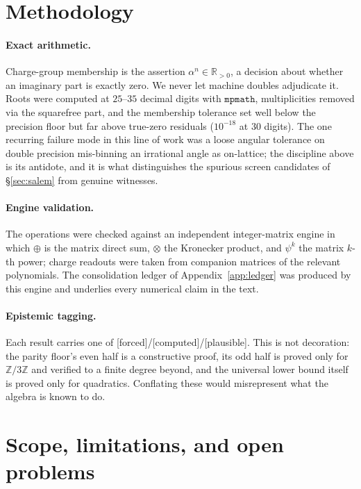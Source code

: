 \documentclass[11pt]{article}
\theoremstyle{definition}
\theoremstyle{remark}
\newcommand{\Z}{\mathbb{Z}}
\newcommand{\R}{\mathbb{R}}
\newcommand{\Adams}[1]{\psi^{#1}}
\newcommand{\dsum}{\oplus}
\newcommand{\tens}{\otimes}
\newcommand{\Zmod}[1]{\Z/#1\Z}
\newcommand{\status}[1]{{\small\textsf{[#1]}}}
\newcommand{\forced}{\status{forced}}
\newcommand{\computed}{\status{computed}}
\newcommand{\plausible}{\status{plausible}}
\begin{document}
\section{Methodology}\label{sec:method}

\paragraph{Exact arithmetic.} Charge-group membership is the assertion
$\alpha^{n}\in\R_{>0}$, a decision about whether an imaginary part is exactly zero. We never
let machine doubles adjudicate it. Roots were computed at $25$--$35$ decimal digits with
$\mathtt{mpmath}$, multiplicities removed via the squarefree part, and the membership
tolerance set well below the precision floor but far above true-zero residuals
($10^{-18}$ at $30$ digits). The one recurring failure mode in this line of work was a loose
angular tolerance on double precision mis-binning an irrational angle as on-lattice; the
discipline above is its antidote, and it is what distinguishes the spurious screen
candidates of \S\ref{sec:salem} from genuine witnesses.

\paragraph{Engine validation.} The operations were checked against an independent
integer-matrix engine in which $\dsum$ is the matrix direct sum, $\tens$ the Kronecker
product, and $\Adams k$ the matrix $k$-th power; charge readouts were taken from companion
matrices of the relevant polynomials. The consolidation ledger of
Appendix~\ref{app:ledger} was produced by this engine and underlies every numerical claim in
the text.

\paragraph{Epistemic tagging.} Each result carries one of \forced{}/\computed{}/\plausible{}.
This is not decoration: the parity floor's even half is a constructive proof, its odd half is
proved only for $\Zmod3$ and verified to a finite degree beyond, and the universal lower
bound itself is proved only for quadratics. Conflating these would misrepresent what the
algebra is known to do.

\section{Scope, limitations, and open problems}\label{sec:scope}
\end{document}
